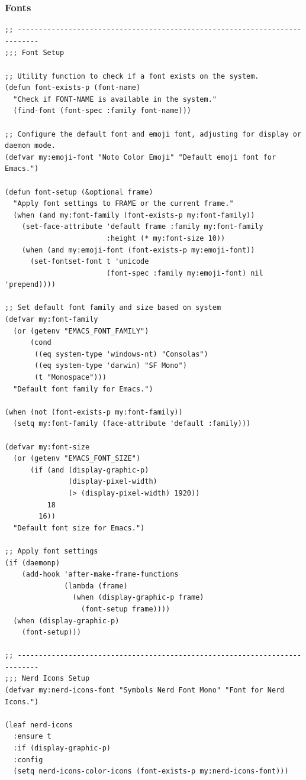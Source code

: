 \documentclass[11pt]{article}
\begin{document}
\subsubsection{Fonts}
\label{sec:org8d961e2}

\begin{verbatim}
;; ---------------------------------------------------------------------------
;;; Font Setup

;; Utility function to check if a font exists on the system.
(defun font-exists-p (font-name)
  "Check if FONT-NAME is available in the system."
  (find-font (font-spec :family font-name)))

;; Configure the default font and emoji font, adjusting for display or daemon mode.
(defvar my:emoji-font "Noto Color Emoji" "Default emoji font for Emacs.")

(defun font-setup (&optional frame)
  "Apply font settings to FRAME or the current frame."
  (when (and my:font-family (font-exists-p my:font-family))
    (set-face-attribute 'default frame :family my:font-family
                        :height (* my:font-size 10))
    (when (and my:emoji-font (font-exists-p my:emoji-font))
      (set-fontset-font t 'unicode
                        (font-spec :family my:emoji-font) nil 'prepend))))

;; Set default font family and size based on system
(defvar my:font-family
  (or (getenv "EMACS_FONT_FAMILY")
      (cond
       ((eq system-type 'windows-nt) "Consolas")
       ((eq system-type 'darwin) "SF Mono")
       (t "Monospace")))
  "Default font family for Emacs.")

(when (not (font-exists-p my:font-family))
  (setq my:font-family (face-attribute 'default :family)))

(defvar my:font-size
  (or (getenv "EMACS_FONT_SIZE")
      (if (and (display-graphic-p)
               (display-pixel-width)
               (> (display-pixel-width) 1920))
          18
        16))
  "Default font size for Emacs.")

;; Apply font settings
(if (daemonp)
    (add-hook 'after-make-frame-functions
              (lambda (frame)
                (when (display-graphic-p frame)
                  (font-setup frame))))
  (when (display-graphic-p)
    (font-setup)))

;; ---------------------------------------------------------------------------
;;; Nerd Icons Setup
(defvar my:nerd-icons-font "Symbols Nerd Font Mono" "Font for Nerd Icons.")

(leaf nerd-icons
  :ensure t
  :if (display-graphic-p)
  :config
  (setq nerd-icons-color-icons (font-exists-p my:nerd-icons-font)))


\end{verbatim}
\end{document}
